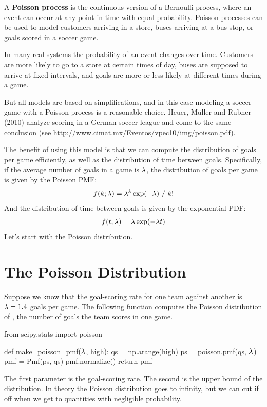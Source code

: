 \documentclass[12pt]{book}
\theoremstyle{exercise}
\begin{document}
A {\bf Poisson process} is the continuous version of a Bernoulli process,
where an event can occur at any point in time with equal probability.
Poisson processes can be used to model customers arriving in a store,
buses arriving at a bus stop, or goals scored in a soccer game.

In many real systems the probability of an event changes over time.
Customers are more likely to go to a store at certain times of day,
buses are supposed to arrive at fixed intervals, and goals are more
or less likely at different times during a game.

But all models are based on simplifications, and in this case modeling
a soccer game with a Poisson process is a reasonable choice.  Heuer,
M\"{u}ller and Rubner (2010) analyze scoring in a German soccer league
and come to the same conclusion (see
\url{http://www.cimat.mx/Eventos/vpec10/img/poisson.pdf}).

The benefit of using this model is that we can compute the distribution
of goals per game efficiently, as well as the distribution of time
between goals.  Specifically, if the average number of goals
in a game is $\mathtt{\lambda}$, the distribution of goals per game is
given by the Poisson PMF:
%
\[ f(k; \mathtt{\lambda}) = \mathtt{\lambda}^k \exp(-\mathtt{\lambda}) ~/~ k! \]
%
And the distribution of time between goals is given by the
exponential PDF:
%
\[ f(t; \mathtt{\lambda}) = \mathtt{\lambda} \exp(-\mathtt{\lambda} t) \]
%
Let's start with the Poisson distribution.


\section{The Poisson Distribution}

Suppose we know that the goal-scoring rate for one team against another is $\mathtt{\lambda} = 1.4$ goals per game.
The following function computes the Poisson distribution of , the number of goals the team scores in one game.

\begin{code}
from scipy.stats import poisson

def make_poisson_pmf($\mathtt{\lambda}$, high):
    qs = np.arange(high)
    ps = poisson.pmf(qs, $\mathtt{\lambda}$)
    pmf = Pmf(ps, qs)
    pmf.normalize()
    return pmf
\end{code}

The first parameter is the goal-scoring rate.  
The second is the upper bound of the distribution.
In theory the Poisson distribution goes to infinity, but we can cut if off when we get to quantities with negligible probability.
\end{document}
